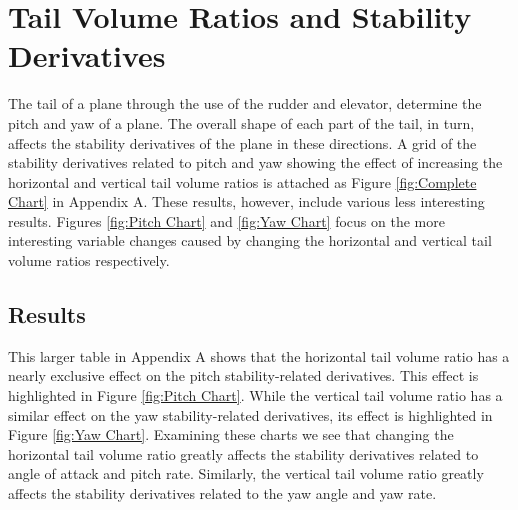 \documentclass{article}
\begin{document}
\section{Tail Volume Ratios and Stability Derivatives}
The tail of a plane through the use of the rudder and elevator, determine the pitch and yaw of a plane. The overall shape of each part of the tail, in turn, affects the stability derivatives of the plane in these directions. A grid of the stability derivatives related to pitch and yaw showing the effect of increasing the horizontal and vertical tail volume ratios is attached as Figure \ref{fig:Complete Chart} in Appendix A. These results, however, include various less interesting results. Figures \ref{fig:Pitch Chart} and \ref{fig:Yaw Chart} focus on the more interesting variable changes caused by changing the horizontal and vertical tail volume ratios respectively.

\subsection{Results}
This larger table in Appendix A shows that the horizontal tail volume ratio has a nearly exclusive effect on the pitch stability-related derivatives. This effect is highlighted in Figure \ref{fig:Pitch Chart}. While the vertical tail volume ratio has a similar effect on the yaw stability-related derivatives, its effect is highlighted in Figure \ref{fig:Yaw Chart}. Examining these charts we see that changing the horizontal tail volume ratio greatly affects the stability derivatives related to angle of attack and pitch rate. Similarly, the vertical tail volume ratio greatly affects the stability derivatives related to the yaw angle and yaw rate.
\end{document}
